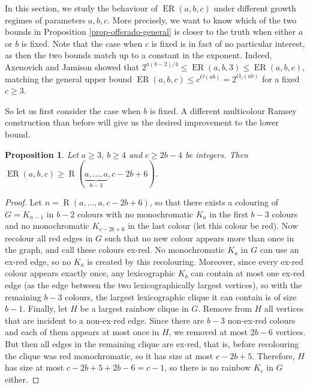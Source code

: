 \documentclass[10pt,a4paper]{article}
\theoremstyle{plain}
\newtheorem{proposition}[theorem]{Proposition}
\theoremstyle{definition}
\newcommand{\offerado}[3]{\operatorname{ER}(#1,#2,#3)}
\begin{document}
In this section, we study the behaviour of $\offerado{a}{b}{c}$ under different growth regimes of parameters $a,b,c$. More precisely, we want to know which of the two bounds in Proposition \ref{prop-offerado-general} is closer to the truth when either $a$ or $b$ is fixed. Note that the case when $c$ is fixed is in fact of no particular interest, as then the two bounds match up to a constant in the exponent. Indeed, Axenovich and Jamison \cite{axenovich2005canonical} showed that $2^{a(b-2)/4}\le \offerado{a}{b}{3}\le \offerado{a}{b}{c}$, matching the general upper bound $\offerado{a}{b}{c}\le c^{O(ab)}=2^{O_c(ab)}$ for a fixed $c\ge 3$.

So let us first consider the case when $b$ is fixed. A different multicolour Ramsey construction than before will give us the desired improvement to the lower bound.

\begin{proposition}\label{prop-lower-offerado-multiram}
    Let $a\ge3$, $b\ge 4$ and $c\ge 2b-4$ be integers. Then $\offerado abc\ge \operatorname{R}(\underbrace{a,\dots,a}_{b-3},c-2b+6)$.
\end{proposition}

\begin{proof}
    Let $n = \operatorname{R}(a,\dots,a,c-2b+6)$, so that there exists a colouring of $G=K_{n-1}$ in $b-2$ colours with no monochromatic $K_a$ in the first $b-3$ colours and no monochromatic $K_{c-2b+6}$ in the last colour (let this colour be red). Now recolour all red edges in $G$ such that no new colour appears more than once in the graph, and call these colours ex-red. No monochromatic $K_a$ in $G$ can use an ex-red edge, so no $K_a$ is created by this recolouring. Moreover, since every ex-red colour appears exactly once, any lexicographic $K_b$ can contain at most one ex-red edge (as the edge between the two lexicographically largest vertices), so with the remaining $b-3$ colours, the largest lexicographic clique it can contain is of size $b-1$. Finally, let $H$ be a largest rainbow clique in $G$. Remove from $H$ all vertices that are incident to a non-ex-red edge. Since there are $b-3$ non-ex-red colours and each of them appears at most once in $H$, we removed at most $2b-6$ vertices. But then all edges in the remaining clique are ex-red, that is, before recolouring the clique was red monochromatic, so it has size at most $c-2b+5$. Therefore, $H$ has size at most $c-2b+5+2b-6=c-1$, so there is no rainbow $K_c$ in $G$ either. 
\end{proof}
\end{document}

